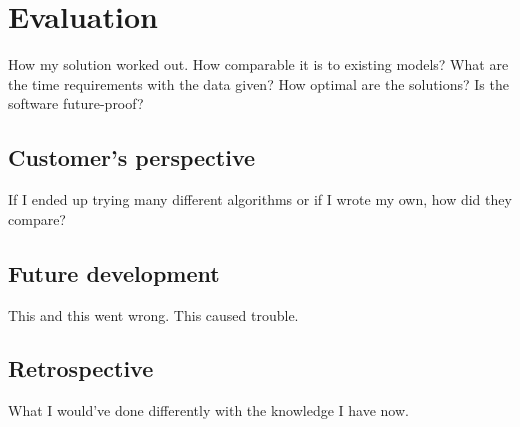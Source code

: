 \chapter{Evaluation}
\label{chapter:evaluation}

How my solution worked out. How comparable it is to existing models? What are the time requirements with the data given? How optimal are the solutions? Is the software future-proof?


\section{Customer's perspective}

If I ended up trying many different algorithms or if I wrote my own, how did they compare?



\section{Future development}

This and this went wrong. This caused trouble.


\section{Retrospective}

What I would've done differently with the knowledge I have now.